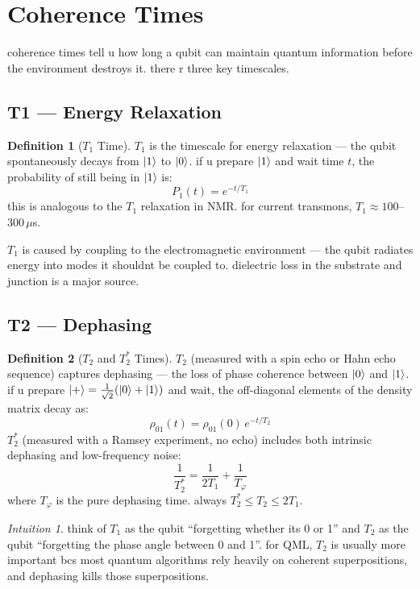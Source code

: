 \documentclass[11pt,a4paper]{article}
\theoremstyle{definition}
\newtheorem{definition}{Definition}[section]
\theoremstyle{remark}
\newtheorem*{intuition}{Intuition}
\begin{document}
\section{Coherence Times}

coherence times tell u how long a qubit can maintain quantum information before the environment destroys it. there r three key timescales.

\subsection{T1 --- Energy Relaxation}

\begin{definition}[$T_1$ Time]
$T_1$ is the timescale for energy relaxation --- the qubit spontaneously decays from $\ket{1}$ to $\ket{0}$. if u prepare $\ket{1}$ and wait time $t$, the probability of still being in $\ket{1}$ is:
\[
P_1(t) = e^{-t/T_1}
\]
this is analogous to the $T_1$ relaxation in NMR. for current transmons, $T_1 \approx 100$--$300 \, \mu$s.
\end{definition}

$T_1$ is caused by coupling to the electromagnetic environment --- the qubit radiates energy into modes it shouldnt be coupled to. dielectric loss in the substrate and junction is a major source.

\subsection{T2 --- Dephasing}

\begin{definition}[$T_2$ and $T_2^*$ Times]
$T_2$ (measured with a spin echo or Hahn echo sequence) captures dephasing --- the loss of phase coherence between $\ket{0}$ and $\ket{1}$. if u prepare $\ket{+} = \frac{1}{\sqrt{2}}(\ket{0} + \ket{1})$ and wait, the off-diagonal elements of the density matrix decay as:
\[
\rho_{01}(t) = \rho_{01}(0) \, e^{-t/T_2}
\]
$T_2^*$ (measured with a Ramsey experiment, no echo) includes both intrinsic dephasing and low-frequency noise:
\[
\frac{1}{T_2^*} = \frac{1}{2T_1} + \frac{1}{T_\varphi}
\]
where $T_\varphi$ is the pure dephasing time. always $T_2^* \leq T_2 \leq 2T_1$.
\end{definition}

\begin{intuition}
think of $T_1$ as the qubit ``forgetting whether its 0 or 1'' and $T_2$ as the qubit ``forgetting the phase angle between 0 and 1''. for QML, $T_2$ is usually more important bcs most quantum algorithms rely heavily on coherent superpositions, and dephasing kills those superpositions.
\end{intuition}
\end{document}
